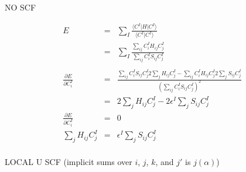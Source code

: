 \documentclass{article}
\begin{document}
NO SCF

\begin{eqnarray*}
E & = & \sum_I{\frac{\langle C^I | H | C^I \rangle}{\langle C^I | C^I \rangle}} \\
  & = & \sum_I \frac{ \sum_{ij}{ C^I_i H_{ij} C^I_j}}{\sum_{ij} { C^I_i S_{ij} C^I_j} } \\
\\
\frac{\partial E}{\partial C^I_i} & = & 
  \frac {\sum_{ij} C^I_i S_{ij} C^I_j 2 \sum_{j} H_{ij} C^I_j - \sum_{ij} C^I_i H_{ij} C^I_j 2 \sum_{j} S_{ij} C^I_j}
        { \left( \sum_{ij} C^I_i S_{ij} C^I_j \right)^2 }\\
  & = & 2 \sum_j H_{ij} C^I_j - 2 \epsilon^I \sum_j S_{ij} C^I_j \\
\frac{\partial E}{\partial C^I_i}  & = & 0 \\ 
\sum_j H_{ij} C^I_j & = & \epsilon^I \sum_j S_{ij} C^I_j \\
\end{eqnarray*}

LOCAL U SCF (implicit sums over $i$, $j$, $k$, and $j'$ is $j(\alpha)$)
\end{document}
